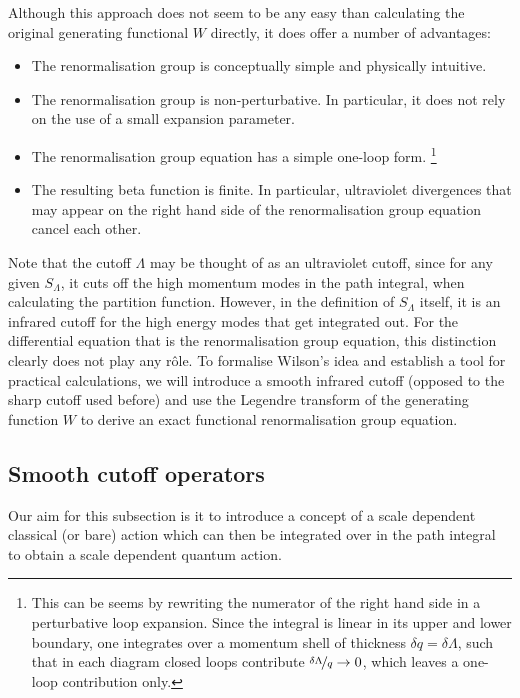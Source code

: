 \documentclass[11pt]{book}
\newcommand{\SLambda}{ S_{\scriptscriptstyle{\Lambda}} }
\numberwithin{equation}{chapter}
\begin{document}
Although this approach does not seem to be any easy than calculating
the original generating functional $W$ directly, it does
offer a number of advantages:
\bigskip
\begin{itemize}
  \setlength\itemsep{1.2mm}
  \item
    The renormalisation group is conceptually simple and physically intuitive.
  \item
    The renormalisation group is non-perturbative.
    In particular, it does not rely on the use of a small expansion parameter.
  \item
    The renormalisation group equation has a simple one-loop form.%
    \footnote{
      This can be seems by rewriting the numerator of the right hand side
      in a perturbative loop expansion. Since the integral is linear
      in its upper and lower boundary, one integrates over a momentum
      shell of thickness $\delta q = \delta \Lambda$,
      such that in each diagram closed loops contribute
      $\nicefrac{\delta \Lambda}{q} \rightarrow 0$, which
      leaves a one-loop contribution only.
    }
  \item
    The resulting beta function is finite.
    In particular, ultraviolet divergences
    that may appear on the right hand side of the renormalisation group
    equation cancel each other.
\end{itemize}
\bigskip
Note that the cutoff $\Lambda$ may be thought of as an ultraviolet cutoff,
since for any given $\SLambda$, it cuts off the high momentum modes in
the path integral, when calculating the partition function.
However, in the definition of $\SLambda$ itself, it is an infrared cutoff
for the high energy modes that get integrated out. For the differential
equation that is the renormalisation group equation, this distinction
clearly does not play any r\^ole. To formalise Wilson's idea and
establish a tool for practical calculations, we will introduce
a smooth infrared cutoff (opposed to the sharp cutoff used before)
and use the Legendre transform of the generating function $W$ to
derive an exact functional renormalisation group equation.


\subsection{Smooth cutoff operators}

Our aim for this subsection is it to introduce a concept of a scale dependent
classical (or bare) action which can then be integrated over in the path
integral to obtain a scale dependent quantum action.
\end{document}
